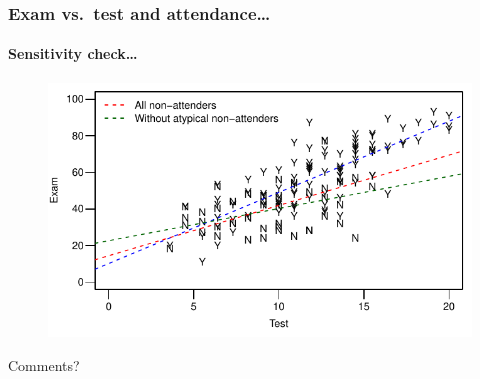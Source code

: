 \documentclass{beamer}\usepackage[]{graphicx}\usepackage[]{xcolor}
\begin{document}
\begin{frame}[fragile, t]
\frametitle{Exam vs.\ test \textbf{and} attendance\ldots} 
\framesubtitle{Sensitivity check\ldots}



\begin{figure}
  \centering
  \includegraphics{figure/RC-H08-040}
\end{figure}

Comments?
\end{frame}



\end{document}

